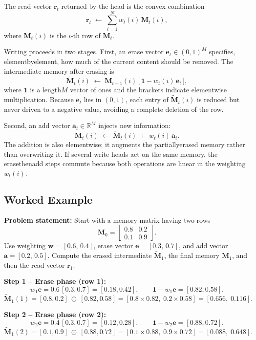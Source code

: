 \documentclass[12pt, a4paper]{article}
\begin{document}
The read vector \(\mathbf{r}_t\) returned by the head is the convex combination  
\[
\mathbf{r}_t \;\leftarrow\; \sum_{i=1}^{N} w_t(i)\,\mathbf{M}_t(i),
\]
where \(\mathbf{M}_t(i)\) is the \(i\)-th row of \(\mathbf{M}_t\).

Writing proceeds in two stages.  
First, an erase vector \(\mathbf{e}_t\in(0,1)^M\) specifies, elementbyelement, how much of the current content should be removed.  
The intermediate memory after erasing is
\[
\tilde{\mathbf{M}}_t(i) \;\leftarrow\; \mathbf{M}_{t-1}(i)\,\bigl[\,\mathbf{1} - w_t(i)\,\mathbf{e}_t\,\bigr],
\]
where \(\mathbf{1}\) is a length\(M\) vector of ones and the brackets indicate elementwise multiplication.  
Because \(\mathbf{e}_t\) lies in \((0,1)\), each entry of \(\tilde{\mathbf{M}}_t(i)\) is reduced but never driven to a negative value, avoiding a complete deletion of the row.

Second, an add vector \(\mathbf{a}_t\in\mathbb{R}^M\) injects new information:
\[
\mathbf{M}_t(i) \;\leftarrow\; \tilde{\mathbf{M}}_t(i) \;+\; w_t(i)\,\mathbf{a}_t.
\]
The addition is also elementwise; it augments the partiallyerased memory rather than overwriting it.  
If several write heads act on the same memory, the erasethenadd steps commute because both operations are linear in the weighting \(w_t(i)\).

\subsection{Worked Example}
\textbf{Problem statement:}  
Start with a memory matrix having two rows  
\[
\mathbf{M}_0 = \begin{bmatrix}0.8 & 0.2 \\[2pt] 0.1 & 0.9\end{bmatrix}.
\]  
Use weighting \(\mathbf{w} = [0.6,\,0.4]\), erase vector \(\mathbf{e} = [0.3,\,0.7]\), and add vector \(\mathbf{a} = [0.2,\,0.5]\).  
Compute the erased intermediate \(\tilde{\mathbf{M}}_1\), the final memory \(\mathbf{M}_1\), and then the read vector \(\mathbf{r}_1\).

\textbf{Step 1 -- Erase phase (row 1):}  
\[
w_1\mathbf{e} = 0.6\,[0.3,0.7] = [0.18,0.42],
\qquad
\mathbf{1} - w_1\mathbf{e} = [0.82,0.58].
\]  
\[
\tilde{\mathbf{M}}_1(1) = [0.8,0.2]\; \odot\; [0.82,0.58]
          = [0.8\times0.82,\; 0.2\times0.58]
          = [0.656,\;0.116].
\]

\textbf{Step 2 -- Erase phase (row 2):}  
\[
w_2\mathbf{e} = 0.4\,[0.3,0.7] = [0.12,0.28],
\qquad
\mathbf{1} - w_2\mathbf{e} = [0.88,0.72].
\]  
\[
\tilde{\mathbf{M}}_1(2) = [0.1,0.9]\; \odot\; [0.88,0.72]
          = [0.1\times0.88,\; 0.9\times0.72]
          = [0.088,\;0.648].
\]
\end{document}
